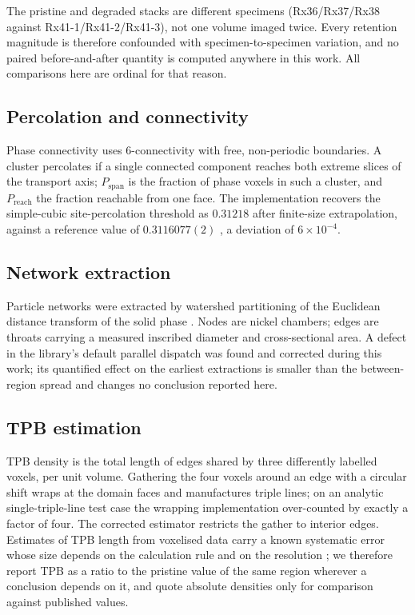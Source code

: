 \documentclass[5p,times,twocolumn]{elsarticle}
\newcommand{\Pspan}{P_{\mathrm{span}}}
\newcommand{\Preach}{P_{\mathrm{reach}}}
\begin{document}
The pristine and degraded stacks are different specimens (Rx36/Rx37/Rx38
against Rx41-1/Rx41-2/Rx41-3), not one volume imaged twice. Every retention
magnitude is therefore confounded with specimen-to-specimen variation, and no
paired before-and-after quantity is computed anywhere in this work. All comparisons here are ordinal for that reason.

\subsection{Percolation and connectivity}

Phase connectivity uses 6-connectivity with free, non-periodic boundaries. A
cluster percolates if a single connected component reaches both extreme slices
of the transport axis; $\Pspan$ is the fraction of phase voxels in such a
cluster, and $\Preach$ the fraction reachable from one face. The
implementation recovers the simple-cubic site-percolation threshold as
$0.31218$ after finite-size extrapolation, against a reference value of
$0.3116077(2)$ \cite{wang2013}, a deviation of $6\times10^{-4}$.

\subsection{Network extraction}

Particle networks were extracted by watershed partitioning of the Euclidean
distance transform of the solid phase \cite{gostick2017}. Nodes are nickel
chambers; edges are throats carrying a measured inscribed diameter and
cross-sectional area. A defect in the library's default parallel dispatch was
found and corrected during this work; its quantified effect on the earliest
extractions is smaller than the between-region spread and changes no
conclusion reported here.

\subsection{TPB estimation}

TPB density is the total length of edges shared by three differently labelled
voxels, per unit volume. Gathering the four voxels around an edge with a
circular shift wraps at the domain faces and manufactures triple lines; on an
analytic single-triple-line test case the wrapping implementation over-counted
by exactly a factor of four. The corrected estimator restricts the gather to
interior edges. Estimates of TPB length from voxelised data carry a known
systematic error whose size depends on the calculation rule and on the
resolution \cite{jorgensen2014,shimura2016}; we therefore report TPB as a
ratio to the pristine value of the same region wherever a conclusion depends
on it, and quote absolute densities only for comparison against published
values.
\end{document}

